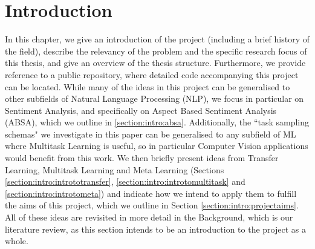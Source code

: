 \chapter{Introduction}
In this chapter, we give an introduction of the project (including a brief history of the field), describe the relevancy of the problem and the specific research focus of this thesis, and give an overview of the thesis structure. Furthermore, we provide reference to a public repository, where detailed code accompanying this project can be located.
While many of the ideas in this project can be generalised to other subfields of Natural Language Processing (NLP), we focus in particular on Sentiment Analysis, and specifically on Aspect Based Sentiment Analysis (ABSA), which we outline in \ref{section:intro:absa}. Additionally, the ``task sampling schemas" we investigate in this paper can be generalised to any subfield of ML where Multitask Learning is useful, so in particular Computer Vision applications would benefit from this work. We then briefly present ideas from Transfer Learning, Multitask Learning and Meta Learning (Sections \ref{section:intro:intrototransfer}, \ref{section:intro:introtomultitask} and \ref{section:intro:introtometa}) and indicate how we intend to apply them to fulfill the aims of this project, which we outline in Section \ref{section:intro:projectaims}. All of these ideas are revisited in more detail in the Background, which is our literature review, as this section intends to be an introduction to the project as a whole. 

